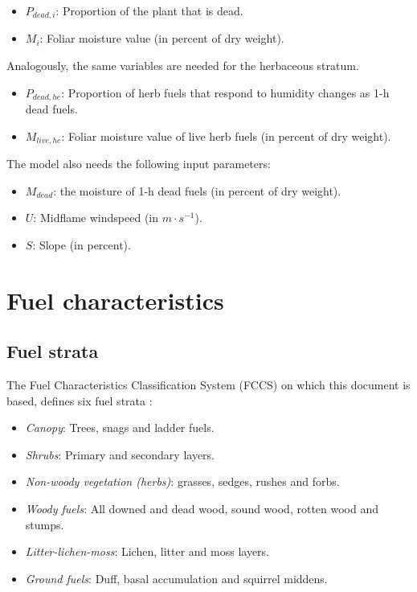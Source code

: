 \documentclass[]{book}
\providecommand{\tightlist}{%
  \setlength{\itemsep}{0pt}\setlength{\parskip}{0pt}}
\begin{document}
\begin{itemize}
\tightlist
\item
  \(P_{dead,i}\): Proportion of the plant that is dead.
\item
  \(M_i\): Foliar moisture value (in percent of dry weight).
\end{itemize}

Analogously, the same variables are needed for the herbaceous stratum.

\begin{itemize}
\tightlist
\item
  \(P_{dead,he}\): Proportion of herb fuels that respond to humidity
  changes as 1-h dead fuels.
\item
  \(M_{live,he}\): Foliar moisture value of live herb fuels (in percent
  of dry weight).
\end{itemize}

The model also needs the following input parameters:

\begin{itemize}
\tightlist
\item
  \(M_{dead}\): the moisture of 1-h dead fuels (in percent of dry
  weight).
\item
  \(U\): Midflame windspeed (in \(m\cdot s^{-1}\)).
\item
  \(S\): Slope (in percent).
\end{itemize}

\section{Fuel characteristics}\label{fuel-characteristics}

\subsection{Fuel strata}\label{fuel-strata}

The Fuel Characteristics Classification System (FCCS) on which this
document is based, defines six fuel strata \citep{Prichard2013}:

\begin{itemize}
\tightlist
\item
  \emph{Canopy}: Trees, snags and ladder fuels.
\item
  \emph{Shrubs}: Primary and secondary layers.
\item
  \emph{Non-woody vegetation (herbs)}: grasses, sedges, rushes and
  forbs.
\item
  \emph{Woody fuels}: All downed and dead wood, sound wood, rotten wood
  and stumps.
\item
  \emph{Litter-lichen-moss}: Lichen, litter and moss layers.
\item
  \emph{Ground fuels}: Duff, basal accumulation and squirrel middens.
\end{itemize}
\end{document}
